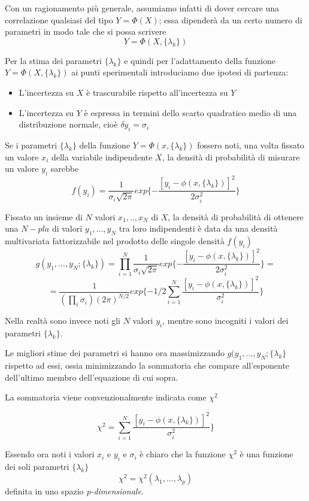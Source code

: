 \documentclass[a4paper]{report}
\begin{document}
Con un ragionamento più generale, assumiamo infatti di dover cercare una correlazione qualsiasi del tipo $Y=\Phi(X)$; essa dipenderà da un certo numero di parametri in modo tale che si possa scrivere
\[Y=\Phi(X,\{\lambda_k\})\]

Per la stima dei parametri $\{\lambda_k\}$ e quindi per l'adattamento della funzione $Y=\Phi(X,\{\lambda_k\})$ ai punti sperimentali introduciamo due ipotesi di partenza:
\begin{itemize}
\item L'incertezza su $X$ è trascurabile rispetto all'incertezza su $Y$
\item L'incertezza su $Y$ è espressa in termini dello scarto quadratico medio di una distribuzione normale, cioè $\delta y_i=\sigma_i$
\end{itemize}

Se i parametri $\{\lambda_k\}$ della funzione $Y=\Phi(x,\{\lambda_k\})$ fossero noti, una volta fissato un valore $x_i$ della variabile indipendente $X$, la densità di probabilità di misurare un valore $y_i$ sarebbe
\[
f(y_i)=\frac{1}{\sigma_i \sqrt{2\pi}} exp\{- \frac{[y_i - \phi(x,\{\lambda_k\})]^2}{2\sigma_i^2}\}
\]

Fissato un insieme di $N$ valori $x_1,..,x_N$ di $X$, la densità di probabilità di ottenere una $N-pla$ di valori $y_1,...,y_N$ tra loro indipendenti è data da una densità multivariata fattorizzabile nel prodotto delle singole densità $f(y_i)$
\[
g(y_1,...,y_N;\{\lambda_k\})=\prod^{N}_{i=1}\frac{1}{\sigma_i \sqrt{2\pi}} exp\{- \frac{[y_i - \phi(x,\{\lambda_k\})]^2}{2\sigma_i^2}\}=\]
\[
=\frac{1}{(\prod_{i}\sigma_i)(2\pi)^{N/2}} exp\{-1/2\sum^{N}_{i=1} \frac{[y_i - \phi(x,\{\lambda_k\})]^2}{\sigma_i^2}\}
\]

Nella realtà sono invece noti gli $N$ valori $y_i$, mentre sono incogniti i valori dei parametri $\{\lambda_k\}$.

Le migliori stime dei parametri si hanno ora massimizzando $g(y_1,...,y_N;\{\lambda_k\}$ rispetto ad essi, ossia minimizzando la sommatoria che compare all'esponente dell'ultimo membro dell'equazione di cui sopra. 

La sommatoria viene convenzionalmente indicata come $\chi^2$

\[
\chi^2=\sum^{N}_{i=1} \frac{[y_i - \phi(x,\{\lambda_k\})]^2}{\sigma_i^2}\}
\]

Essendo ora noti i valori $x_i$ e $y_i$ e $\sigma_i$ è chiaro che la funzione $\chi^2$ è una funzione dei soli parametri $\{\lambda_k\}$
\[
\chi^2=\chi^2(\lambda_1,...,\lambda_p)
\]
definita in uno spazio \textit{p-dimensionale}.
\end{document}
